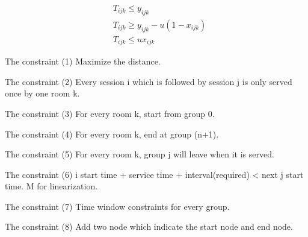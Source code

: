 
$$
\begin{aligned}
& T_{ijk} \leq y_{ijk} \\
& T_{ijk} \geq y_{ijk} - u(1-x_{ijk})    \\
& T_{ijk} \leq u x_{ijk}
\end{aligned}$$

The constraint (1) Maximize the distance.

The constraint (2) Every session i which is followed by session j is only served once by one room k.

The constraint (3) For every room k, start from group 0.

The constraint (4) For every room k, end at group (n+1).

The constraint (5) For every room k, group j will leave when it is served.

The constraint (6) i start time + service time + interval(required) < next j start time. M for linearization.

The constraint (7) Time window constraints for every group. 

The constraint (8) Add two node which indicate the start node and end node.



